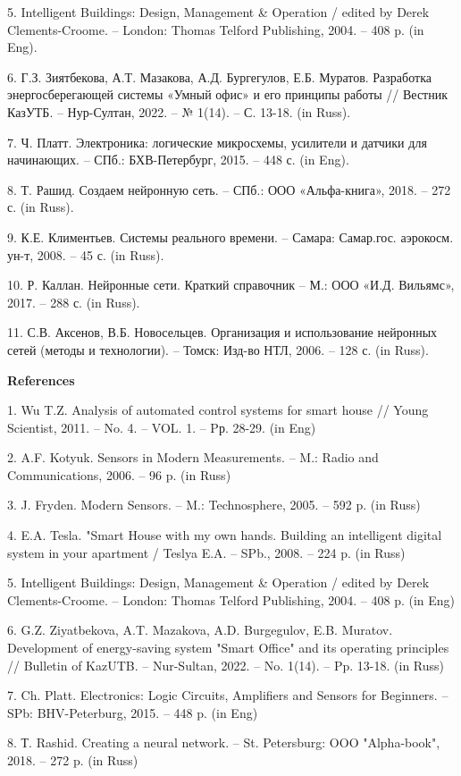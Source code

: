 5. Intelligent Buildings: Design, Management \& Operation / edited by
Derek Clements-Croome. -- London: Thomas Telford Publishing, 2004. --
408 p. (in Eng).

6. Г.З. Зиятбекова, А.Т. Мазакова, А.Д. Бургегулов, Е.Б. Муратов.
Разработка энергосберегающей системы «Умный офис» и его принципы работы
// Вестник КазУТБ. -- Нур-Султан, 2022. -- № 1(14). -- С. 13-18. (in
Russ).

7. Ч. Платт. Электроника: логические микросхемы, усилители и датчики для
начинающих. -- СПб.: БХВ-Петербург, 2015. -- 448 с. (in Eng).

8. Т. Рашид. Создаем нейронную сеть. -- СПб.: ООО «Альфа-книга», 2018.
-- 272 с. (in Russ).

9. К.Е. Климентьев. Системы реального времени. -- Самара: Самар.гос.
аэрокосм. ун-т, 2008. -- 45 с. (in Russ).

10. Р. Каллан. Нейронные сети. Краткий справочник -- М.: ООО «И.Д.
Вильямс», 2017. -- 288 с. (in Russ).

11. С.В. Аксенов, В.Б. Новосельцев. Организация и использование
нейронных сетей (методы и технологии). -- Томск: Изд-во НТЛ, 2006. --
128 с. (in Russ).

{\bfseries\centering References}

1. Wu T.Z. Analysis of automated control systems for smart house //
Young Scientist, 2011. -- No. 4. -- VOL. 1. -- Pр. 28-29. (in Eng)

2. A.F. Kotyuk. Sensors in Modern Measurements. -- M.: Radio and
Communications, 2006. -- 96 p. (in Russ)

3. J. Fryden. Modern Sensors. -- M.: Technosphere, 2005. -- 592 p. (in
Russ)

4. E.A. Tesla. "Smart House with my own hands. Building an intelligent
digital system in your apartment / Teslya E.A. -- SPb., 2008. -- 224 p.
(in Russ)

5. Intelligent Buildings: Design, Management \& Operation / edited by
Derek Clements-Croome. -- London: Thomas Telford Publishing, 2004. --
408 p. (in Eng)

6. G.Z. Ziyatbekova, A.T. Mazakova, A.D. Burgegulov, E.B. Muratov.
Development of energy-saving system "Smart Office" and its operating
principles // Bulletin of KazUTB. -- Nur-Sultan, 2022. -- No. 1(14). --
Pp. 13-18. (in Russ)

7. Ch. Platt. Electronics: Logic Circuits, Amplifiers and Sensors for
Beginners. -- SPb: BHV-Peterburg, 2015. -- 448 p. (in Eng)

8. Т. Rashid. Creating a neural network. -- St. Petersburg: OOO
"Alpha-book", 2018. -- 272 p. (in Russ)


